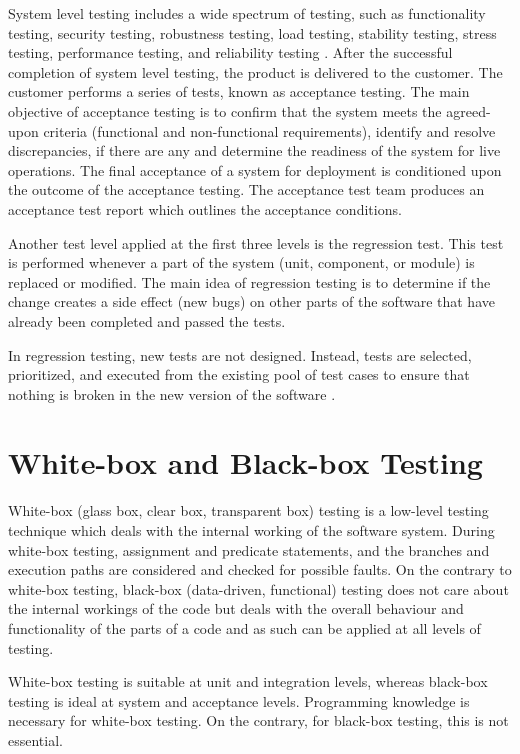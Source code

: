 System level testing includes a wide spectrum of testing, such as functionality testing, security testing, robustness testing, load testing, stability testing, stress testing, performance testing, and reliability testing \autocite{naik2011software}. After the successful completion of system level testing, the product is delivered to the customer. The customer performs a series of tests, known as acceptance testing. The main objective of acceptance testing is to confirm that the system meets the agreed-upon criteria (functional and non-functional requirements), identify and resolve discrepancies, if there are any and determine the readiness of the system for live operations. The final acceptance of a system for deployment is conditioned upon the outcome of the acceptance testing. The acceptance test team produces an acceptance test report which outlines the acceptance conditions. 

Another test level applied at the first three levels is the regression test. This test is performed whenever a part of the system (unit, component, or module) is replaced or modified. The main idea of regression testing is to determine if the change creates a side effect (new bugs) on other parts of the software that have already been completed and passed the tests. 

In regression testing, new tests are not designed. Instead, tests are selected, prioritized, and executed from the existing pool of test cases to ensure that nothing is broken in the new version of the software \autocite{naik2011software}. 

\section{White-box and Black-box Testing}
White-box (glass box, clear box, transparent box) testing is a low-level testing technique which deals with the internal working of the software system. During white-box testing, assignment and predicate statements, and the branches and execution paths are considered and checked for possible faults. On the contrary to white-box testing, black-box (data-driven, functional) testing does not care about the internal workings of the code but deals with the overall behaviour and functionality of the parts of a code and as such can be applied at all levels of testing.

White-box testing is suitable at unit and integration levels, whereas black-box testing is ideal at system and acceptance levels. Programming knowledge is necessary for white-box testing. On the contrary, for black-box testing, this is not essential.

